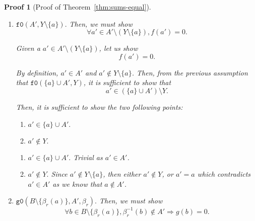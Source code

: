 \documentclass[pdflatex,sn-mathphys]{sn-jnl}%
\theoremstyle{thmstyleone}%
\theoremstyle{thmstyletwo}%
\newtheorem*{pf}{Proof}%
\theoremstyle{thmstylethree}%
\begin{document}
\begin{pf}[Proof of Theorem~\ref{thm:sums-equal}]
\begin{enumerate}
\begin{enumerate}
\begin{enumerate}
          \item $\boxed{\mathtt{f0}(A',Y\setminus\{a\}).}$ Then, we must show
            \begin{equation*}
              \boxed{\forall{}a'\in{}A'\setminus(Y\setminus\{a\}),f(a')=0.}
            \end{equation*}

            Given a $a'\in{}A'\setminus(Y\setminus\{a\})$, let us show
            \begin{equation*}
              \boxed{f(a')=0.}
            \end{equation*}

            By definition, $a'\in{}A'$ and
            $a'\notin{}Y\setminus\{a\}$. Then, from the previous
            assumption that $\mathtt{f0}(\{a\}\cup{}A',Y)$, it is
            sufficient to show that
            \begin{equation*}
              \boxed{a'\in(\{a\}\cup{}A')\setminus{}Y.}
            \end{equation*}

            Then, it is sufficient to show the two following points:
            \begin{enumerate}
            \item $\boxed{a'\in\{a\}\cup{}A'.}$
            \item $\boxed{a'\notin{}Y.}$
            \end{enumerate}

            \vspace{10pt}

            \begin{enumerate}
            \item $\boxed{a'\in\{a\}\cup{}A'.}$ Trivial as $a'\in{}A'$.
            \item $\boxed{a'\notin{}Y.}$ Since
              $a'\notin{}Y\setminus\{a\}$, then either $a'\notin{}Y$,
              or $a'=a$ which contradicts $a'\in{}A'$ as we know that
              $a\notin{}A'$.
            \end{enumerate}
            
          \item $\boxed{\mathtt{g0}(B\setminus\{\beta_r(a)\},A',\beta_r).}$ Then, we must show
            \begin{equation*}
              \boxed{\forall{}b\in{}B\setminus\{\beta_r(a)\},\beta_r^{-1}(b)\notin{}A'\Rightarrow{}g(b)=0.}
            \end{equation*}


\end{enumerate}
\end{enumerate}
\end{enumerate}
\end{pf}
\end{document}
